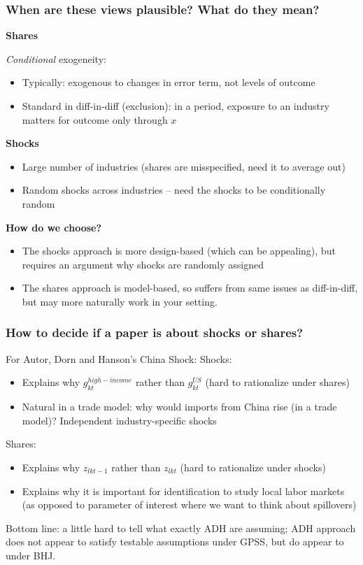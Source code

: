 \documentclass[notes,11pt, aspectratio=169]{beamer}
\begin{document}
\begin{frame}
\frametitle{When are these views plausible? What do they mean?}


\textbf{Shares}

\textit{Conditional} exogeneity:
\begin{itemize}
\item Typically: exogenous to changes in error term, not levels of outcome
\item Standard in diff-in-diff (exclusion): in a period, exposure to an industry matters for outcome only through $x$
\end{itemize}


\textbf{Shocks}

\begin{itemize}
\item Large number of industries (shares are misspecified, need it to average out)
\item Random shocks across industries -- need the shocks to be conditionally random
\end{itemize}


\textbf{How do we choose?}
\begin{itemize}
\item The shocks approach is more design-based (which can be
  appealing), but requires an argument why shocks are randomly
  assigned
\item The shares approach is model-based, so suffers from same issues
  as diff-in-diff, but may more naturally work in your setting.
\end{itemize}

\end{frame}

\begin{frame}
\frametitle{How to decide if a paper is  about shocks or shares?}

For Autor, Dorn and Hanson's China Shock:
Shocks:
\begin{itemize}
\item  Explains why $g_{kt}^{high-income}$ rather than $g_{kt}^{US}$  (hard to rationalize under shares)
\item Natural in a trade model: why would imports from China rise (in a trade model)?  Independent industry-specific shocks
\end{itemize}

Shares:
\begin{itemize}
\item Explains why $z_{lkt-1}$ rather than $z_{lkt}$ (hard to rationalize under shocks)
\item Explains why it is important for identification to study local labor markets (as opposed to parameter of interest where we want to think about spillovers)
\end{itemize}

\medskip

Bottom line: a little hard to tell what exactly ADH are assuming; ADH approach does not appear to satisfy testable assumptions under GPSS, but do appear to under BHJ.
\end{frame}
\end{document}
